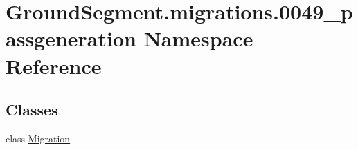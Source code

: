 \hypertarget{namespace_ground_segment_1_1migrations_1_10049__passgeneration}{}\section{Ground\+Segment.\+migrations.0049\+\_\+passgeneration Namespace Reference}
\label{namespace_ground_segment_1_1migrations_1_10049__passgeneration}
\subsection*{Classes}
\begin{DoxyCompactItemize}
\item 
class \hyperlink{class_ground_segment_1_1migrations_1_10049__passgeneration_1_1_migration}{Migration}
\end{DoxyCompactItemize}
